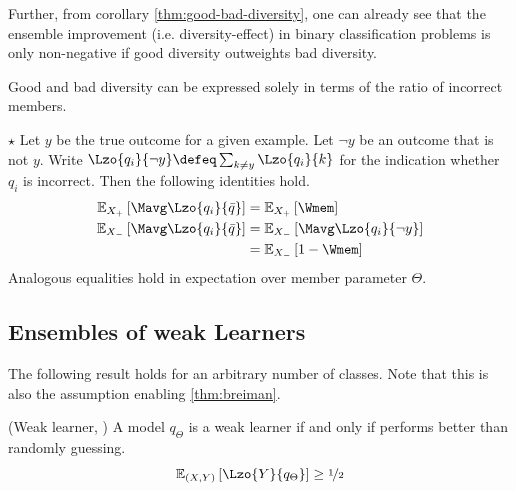 \documentclass[../main.tex]{subfiles}
\begin{document}
Further, from corollary \ref{thm:good-bad-diversity}, one can already see that the ensemble improvement (i.e. diversity-effect) in binary classification problems is only non-negative if good diversity outweights bad diversity.


Good and bad diversity can be expressed solely in terms of the ratio of incorrect members. 
\begin{lemma} 
    \label{thm:good-bad-diversity-W}
    $\star$ Let $y$ be the true outcome for a given example. Let $\neg y$ be an outcome that is not $y$. Write $\Lzo{q_i}{\neg y} \defeq \sum_{k \not= y} \Lzo{q_i}{k}$ for the indication whether $q_i$ is incorrect. Then the following identities hold.
\begin{align*}
\mathbb{E}_{X_{+}}\left[ \Mavg \Lzo{q_{i}}{\bar{q}} \right] &=
\mathbb{E}_{X_{+}}\left[ \Wmem \right]   \\
\mathbb{E}_{X_{-}}\left[ \Mavg \Lzo{q_{i}}{\bar{q}} \right]  &= \mathbb{E}_{X_{-}}\left[ \Mavg  \Lzo{q_{i}}{\neg y} \right]  \\
&=
\mathbb{E}_{X_{-}}\left[ 1 - \Wmem \right]
\end{align*}
Analogous equalities hold in expectation over member parameter $\Theta$.
\end{lemma}

\subsection{Ensembles of weak Learners}

The following result holds for an arbitrary number of classes. Note that this is also the assumption enabling \cref{thm:breiman}.

\begin{definition} 
   \label{def:weak-learner}  (Weak learner, \cite{theisen_WhenAreEnsembles_2023,wood_BiasVarianceDecompositionsMargin_2022})
   A model $q_{\Theta}$ is a weak learner if and only if performs better than randomly guessing.
$$
\mathbb{E}_{(X,Y) }\left[ \Lzo{Y}{q_{\Theta}} \right] \geq \nicefrac{1}{2}
$$
\end{definition}
\end{document}

